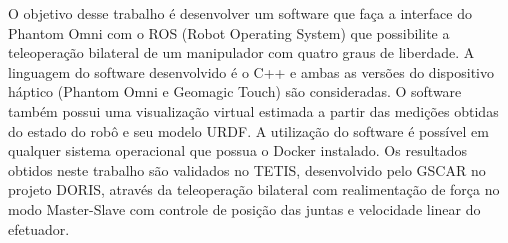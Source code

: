 \begin{foreignabstract}
	
	O objetivo desse trabalho é desenvolver um software que faça a interface do Phantom Omni com o ROS (Robot Operating System) que possibilite a teleoperação bilateral de um manipulador com quatro graus de liberdade. A linguagem do software desenvolvido é o C++ e ambas as versões do dispositivo háptico (Phantom Omni e Geomagic Touch) são consideradas. O software também possui uma visualização virtual estimada a partir das medições obtidas do estado do robô e seu modelo URDF. A utilização do software é possível em qualquer sistema operacional que possua o Docker instalado. Os resultados obtidos neste trabalho são validados no TETIS, desenvolvido pelo GSCAR no projeto DORIS, através da teleoperação bilateral com realimentação de força no modo Master-Slave com controle de posição das juntas e velocidade linear do efetuador.
	
\end{foreignabstract}